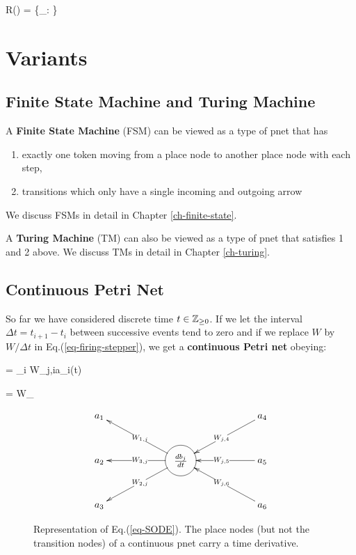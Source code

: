 \beq
R(\Phi) = \{_\calp: 
 \}
\eeq

\section{Variants}

\subsection{Finite State Machine and Turing Machine}
A {\bf Finite State Machine}
(FSM)
can be viewed as 
a type of pnet that has
\begin{enumerate}
\item exactly one token moving from a place node to another place node with each step,
\item transitions which only have a single incoming and outgoing arrow
\end{enumerate}
We discuss 
FSMs in detail in Chapter \ref{ch-finite-state}.

A {\bf Turing Machine} (TM) can also be viewed as 
a type of pnet that satisfies 1 and 2 above.
We discuss TMs in detail in Chapter \ref{ch-turing}.




\subsection{Continuous Petri Net}
So far we have considered
discrete time $t\in {\mathbb{Z}}_{\geq 0}$.
If we let the interval $\Delta t=t_{i+1}-t_i$ between
successive events tend to zero
and if we replace $W$ by 
$W/\Delta t$ in Eq.(\ref{eq-firing-stepper}), we get
a {\bf continuous Petri net} obeying:

\beq
{}=
\sum_i W_{j,i}a_i(t)
\label{eq-SODE}
\eeq


\beq
{}=
W_\calx
\label{eq-diff-eq-W}
\eeq


\begin{figure}[h!]
$$
\xymatrix@C=5pc{
{a_1}
&&{a_4}
\ar[dl]|{W_{j,4}}
\\
{a_2}
&
*+++[o][F-]{\frac{db_j}{dt}}
\ar[lu]|{W_{1, j}}
\ar[ld]|{W_{2,j}}
\ar[l]|{W_{3, j}}
& {a_5}
\ar[l]|{W_{j,5}}
\\
{a_3}
&&
{a_6}
\ar[lu]|{W_{j,6}}
}$$
\caption{Representation of Eq.(\ref{eq-SODE}). The place nodes (but not the transition nodes)
of a continuous pnet carry a time derivative.}
\label{fig-continuous-pn}
\end{figure}


